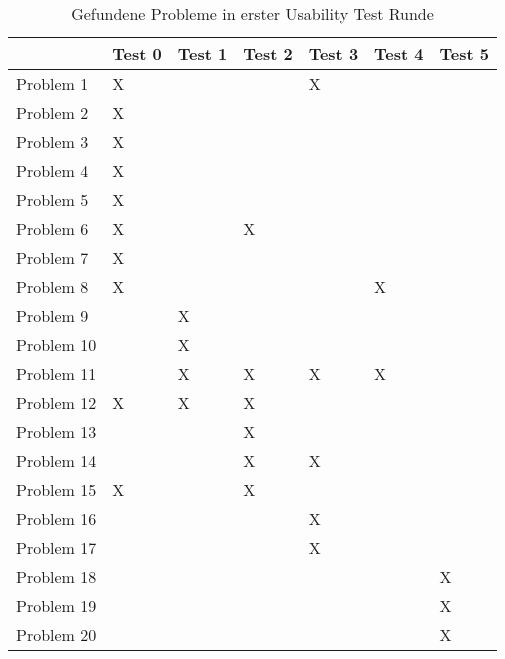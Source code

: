 \begin{table}[H]
\caption{Gefundene Probleme in erster Usability Test Runde}
    \begin{tabular}{l||l|l|l|l|l|l}
                & Test 0 & Test 1 & Test 2 & Test 3 & Test 4 & Test 5 \\ \hline
    Problem 1   & X      &        &        & X      &        &        \\
    Problem 2   & X      &        &        &        &        &        \\
    Problem 3   & X      &        &        &        &        &        \\
    Problem 4   & X      &        &        &        &        &        \\
    Problem 5   & X      &        &        &        &        &        \\
    Problem 6   & X      &        & X      &        &        &        \\
    Problem 7   & X      &        &        &        &        &        \\
    Problem 8   & X      &        &        &        & X      &        \\
    Problem 9   &        & X      &        &        &        &        \\
    Problem 10  &        & X      &        &        &        &        \\
    Problem 11  &        & X      & X      & X      & X      &        \\
    Problem 12  & X      & X      & X      &        &        &        \\
    Problem 13  &        &        & X      &        &        &        \\
    Problem 14  &        &        & X      & X      &        &        \\
    Problem 15  & X      &        & X      &        &        &        \\
    Problem 16  &        &        &        & X      &        &        \\
    Problem 17  &        &        &        & X      &        &        \\
    Problem 18  &        &        &        &        &        & X      \\
    Problem 19  &        &        &        &        &        & X      \\
    Problem 20  &        &        &        &        &        & X      \\ \hline
    \end{tabular}    
\end{table}

